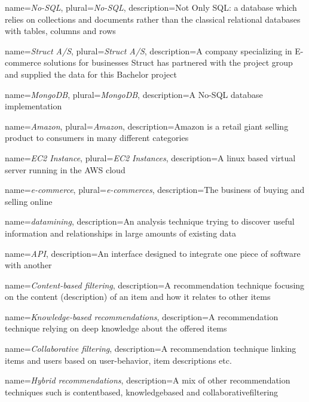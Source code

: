 
{
	name=\textit{No-SQL},
	plural=\textit{No-SQL},
	description={Not Only SQL: a database which relies on collections and documents rather than the classical relational databases with tables, columns and rows}
}

{
	name=\textit{Struct A/S},
	plural=\textit{Struct A/S},
	description={A company specializing in E-commerce solutions for businesses Struct has partnered with the project group and supplied the data for this Bachelor project}
}

{
	name=\textit{MongoDB},
	plural=\textit{MongoDB},
	description={A No-SQL database implementation}
}

{
	name=\textit{Amazon},
	plural=\textit{Amazon},
	description={Amazon is a retail giant selling product to consumers in many different categories}
}

{
	name=\textit{EC2 Instance},
	plural=\textit{EC2 Instances},
	description={A linux based virtual server running in the AWS cloud}
}

{
	name=\textit{e-commerce},
	plural=\textit{e-commerces},
	description={The business of buying and selling online}
}

{
	name=\textit{datamining},
	description={An analysis technique trying to discover useful information and relationships in large amounts of existing data}
}

{
	name=\textit{API},
	description={An interface designed to integrate one piece of software with another}
}

{
	name=\textit{Content-based filtering},
	description={A recommendation technique focusing on the content (description) of an item and how it relates to other items}
}

{
	name=\textit{Knowledge-based recommendations},
	description={A recommendation technique relying on deep knowledge about the offered items}
}

{
	name=\textit{Collaborative filtering},
	description={A recommendation technique linking items and users based on user-behavior, item descriptions etc.}
}

{
	name=\textit{Hybrid recommendations},
	description={A mix of other recommendation techniques such is \gls{contentbased}, \gls{knowledgebased} and \gls{collaborativefiltering}}
}

